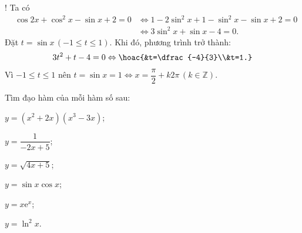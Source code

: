 \begin{bt}
{\begin{listEX}[2]
			\item! Ta có
			\begin{eqnarray*}
				& \cos{2x}+\cos^2{x}-\sin{x}+2=0 & \Leftrightarrow 1-2\sin^2{x}+1-\sin^2{x}-\sin{x}+2=0\\
				& & \Leftrightarrow 3\sin^2{x}+\sin{x}-4=0.
			\end{eqnarray*}
			Đặt $t=\sin{x}\,(-1\le t\le 1)$. Khi đó, phương trình trở thành:
			$$
			3t^2+t-4=0 \Leftrightarrow \hoac{&t=\dfrac{-4}{3}\\&t=1.}
			$$
			Vì $-1\le t\le 1$ nên $t=\sin{x}=1\Leftrightarrow x=\dfrac{\pi}{2}+k2\pi\,(k\in\mathbb{Z})$.
		\end{listEX}
	}
\end{bt}

\begin{bt}%
	Tìm đạo hàm của mỗi hàm số sau:
	\begin{listEX}[3]
		\item[a)] $y=\left(x^2+2 x\right)\left(x^3-3 x\right)$;
		\item[b)] $y=\dfrac{1}{-2 x+5}$;
		\item[c)] $y=\sqrt{4 x+5}$;
		\item[d)] $y=\sin x \cos x$;
		\item[e)] $y=x \mathrm{e}^x$;
		\item[f)] $y=\ln ^2 x$.
	\end{listEX}
\end{bt}
